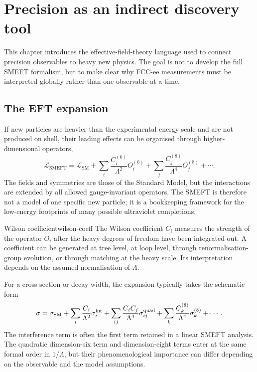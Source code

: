 \documentclass[11pt,a4paper]{article}
\newcommand{\Lag}{\mathcal{L}}
\newcommand{\SM}{\mathrm{SM}}
\newcommand{\SMEFT}{\mathrm{SMEFT}}
\numberwithin{equation}{section}
\begin{document}
\newpage
\section{Precision as an indirect discovery tool}
\begin{guidelinebox}
This chapter introduces the effective-field-theory language used to connect precision observables to heavy new physics. The goal is not to develop the full SMEFT formalism, but to make clear why FCC-ee measurements must be interpreted globally rather than one observable at a time.
\end{guidelinebox}

\subsection{The EFT expansion}
If new particles are heavier than the experimental energy scale and are not produced on shell, their leading effects can be organised through higher-dimensional operators,
\begin{equation}
  \Lag_{\SMEFT}=\Lag_{\SM}+\sum_i \frac{C_i^{(6)}}{\Lambda^2}O_i^{(6)}
  +\sum_j\frac{C_j^{(8)}}{\Lambda^4}O_j^{(8)}+\cdots .
  \label{eq:smeft-lagrangian-basic}
\end{equation}
The fields and symmetries are those of the Standard Model, but the interactions are extended by all allowed gauge-invariant operators. The SMEFT is therefore not a model of one specific new particle; it is a bookkeeping framework for the low-energy footprints of many possible ultraviolet completions.

\begin{definition}{Wilson coefficient}{wilson-coeff}
The Wilson coefficient \(C_i\) measures the strength of the operator \(O_i\) after the heavy degrees of freedom have been integrated out. A coefficient can be generated at tree level, at loop level, through renormalisation-group evolution, or through matching at the heavy scale. Its interpretation depends on the assumed normalisation of \(\Lambda\).
\end{definition}

For a cross section or decay width, the expansion typically takes the schematic form
\begin{equation}
  \sigma = \sigma_{\SM}
  +\sum_i \frac{C_i}{\Lambda^2}\sigma_i^{\rm int}
  +\sum_{ij}\frac{C_iC_j}{\Lambda^4}\sigma_{ij}^{\rm quad}
  +\sum_k\frac{C_k^{(8)}}{\Lambda^4}\sigma_k^{(8)}+\cdots .
  \label{eq:sigma-expansion}
\end{equation}
The interference term is often the first term retained in a linear SMEFT analysis. The quadratic dimension-six term and dimension-eight terms enter at the same formal order in \(1/\Lambda\), but their phenomenological importance can differ depending on the observable and the model assumptions.
\end{document}
